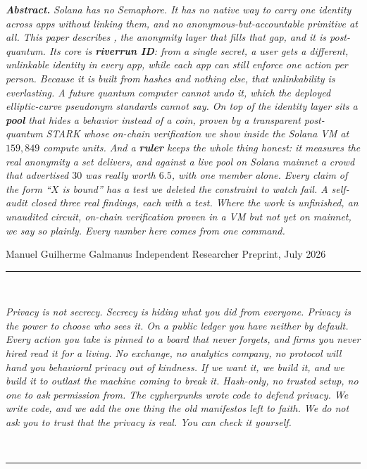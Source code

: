 \documentclass[11pt]{article}
\begin{document}
\begin{center}
\begin{minipage}{0.88\textwidth}
\small
\textbf{\itshape Abstract.} \itshape Solana has no Semaphore. It has no native way to
carry one identity across apps without linking them, and no anonymous-but-accountable
primitive at all. This paper describes \river, the anonymity layer that fills that gap,
and it is post-quantum. Its core is \textbf{riverrun ID}: from a single secret, a user
gets a different, unlinkable identity in every app, while each app can still enforce
one action per person. Because it is built from hashes and nothing else, that
unlinkability is everlasting. A future quantum computer cannot undo it, which the
deployed elliptic-curve pseudonym standards cannot say. On top of the identity layer
sits a \textbf{pool} that hides a behavior instead of a coin, proven by a transparent
post-quantum STARK whose on-chain verification we show inside the Solana VM at
$159{,}849$ compute units. And a \textbf{ruler} keeps the whole thing honest: it
measures the real anonymity a set delivers, and against a live pool on Solana mainnet a
crowd that advertised $30$ was really worth $6.5$, with one member alone. Every claim
of the form ``$X$ is bound'' has a test we deleted the constraint to watch fail. A
self-audit closed three real findings, each with a test. Where the work is unfinished,
an unaudited circuit, on-chain verification proven in a VM but not yet on mainnet, we
say so plainly. Every number here comes from one command.
\end{minipage}
\end{center}
\vspace{1.0em}

\begin{center}
\small\color{steel}
Manuel Guilherme Galmanus \quad\textbullet\quad Independent Researcher \quad\textbullet\quad Preprint, July 2026
\end{center}

\vspace{1.0em}
\begin{center}
{\color{river}\rule{0.7\textwidth}{0.4pt}}\\[0.8em]
\begin{minipage}{0.86\textwidth}
\small\itshape\color{ink}
Privacy is not secrecy. Secrecy is hiding what you did from everyone. Privacy is the
power to choose who sees it. On a public ledger you have neither by default. Every
action you take is pinned to a board that never forgets, and firms you never hired
read it for a living. No exchange, no analytics company, no protocol will hand you
behavioral privacy out of kindness. If we want it, we build it, and we build it to
outlast the machine coming to break it. Hash-only, no trusted setup, no one to ask
permission from. The cypherpunks wrote code to defend privacy. We write code, and we
add the one thing the old manifestos left to faith. We do not ask you to trust that the
privacy is real. You can check it yourself.
\end{minipage}\\[0.8em]
{\color{river}\rule{0.7\textwidth}{0.4pt}}
\end{center}
\vspace{0.8em}
\end{document}
